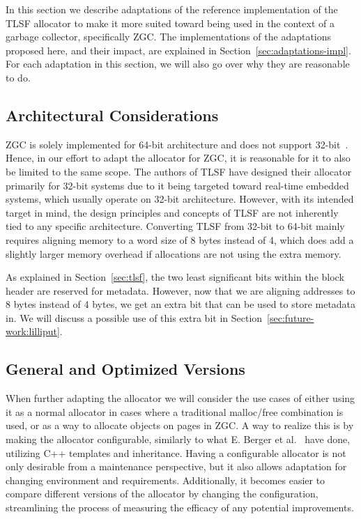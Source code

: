 In this section we describe adaptations of the reference implementation of the TLSF allocator to make it more suited toward being used in the context of a garbage collector, specifically ZGC. The implementations of the adaptations proposed here, and their impact, are explained in Section~\ref{sec:adaptations-impl}. For each adaptation in this section, we will also go over why they are reasonable to do.

\subsection{Architectural Considerations}
\label{sec:adaptations:architectural-considerations}

ZGC is solely implemented for 64-bit architecture and does not support 32-bit~\cite{zgc_deep_dive}. Hence, in our effort to adapt the allocator for ZGC, it is reasonable for it to also be limited to the same scope. The authors of TLSF have designed their allocator primarily for 32-bit systems due to it being targeted toward real-time embedded systems, which usually operate on 32-bit architecture. However, with its intended target in mind, the design principles and concepts of TLSF are not inherently tied to any specific architecture. Converting TLSF from 32-bit to 64-bit mainly requires aligning memory to a word size of 8 bytes instead of 4, which does add a slightly larger memory overhead if allocations are not using the extra memory.

As explained in Section~\ref{sec:tlsf}, the two least significant bits within the block header are reserved for metadata. However, now that we are aligning addresses to 8 bytes instead of 4 bytes, we get an extra bit that can be used to store metadata in. We will discuss a possible use of this extra bit in Section~\ref{sec:future-work:lilliput}.

\subsection{General and Optimized Versions}


When further adapting the allocator we will consider the use cases of either using it as a normal allocator in cases where a traditional malloc/free combination is used, or as a way to allocate objects on pages in ZGC. A way to realize this is by making the allocator configurable, similarly to what E. Berger et al.~\cite{configurable_allocator} have done, utilizing C++ templates and inheritance. Having a configurable allocator is not only desirable from a maintenance perspective, but it also allows adaptation for changing environment and requirements. Additionally, it becomes easier to compare different versions of the allocator by changing the configuration, streamlining the process of measuring the efficacy of any potential improvements.

